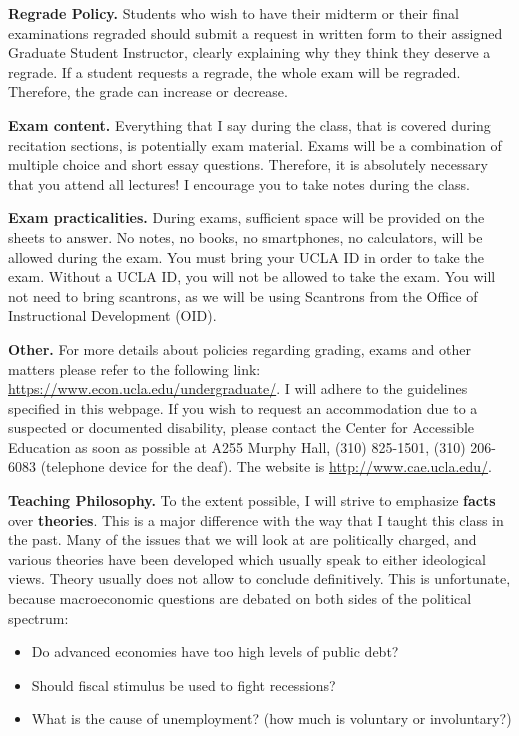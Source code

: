 \documentclass[]{book}
\providecommand{\tightlist}{%
  \setlength{\itemsep}{0pt}\setlength{\parskip}{0pt}}
\begin{document}
\textbf{Regrade Policy.} Students who wish to have their midterm or
their final examinations regraded should submit a request in written
form to their assigned Graduate Student Instructor, clearly explaining
why they think they deserve a regrade. If a student requests a regrade,
the whole exam will be regraded. Therefore, the grade can increase or
decrease.

\textbf{Exam content.} Everything that I say during the class, that is
covered during recitation sections, is potentially exam material. Exams
will be a combination of multiple choice and short essay questions.
Therefore, it is absolutely necessary that you attend all lectures! I
encourage you to take notes during the class.

\textbf{Exam practicalities.} During exams, sufficient space will be
provided on the sheets to answer. No notes, no books, no smartphones, no
calculators, will be allowed during the exam. You must bring your UCLA
ID in order to take the exam. Without a UCLA ID, you will not be allowed
to take the exam. You will not need to bring scantrons, as we will be
using Scantrons from the Office of Instructional Development (OID).

\textbf{Other.} For more details about policies regarding grading, exams
and other matters please refer to the following link:
\url{https://www.econ.ucla.edu/undergraduate/}. I will adhere to the
guidelines specified in this webpage. If you wish to request an
accommodation due to a suspected or documented disability, please
contact the Center for Accessible Education as soon as possible at A255
Murphy Hall, (310) 825-1501, (310) 206-6083 (telephone device for the
deaf). The website is \url{http://www.cae.ucla.edu/}.

\textbf{Teaching Philosophy.} To the extent possible, I will strive to
emphasize \textbf{facts} over \textbf{theories}. This is a major
difference with the way that I taught this class in the past. Many of
the issues that we will look at are politically charged, and various
theories have been developed which usually speak to either ideological
views. Theory usually does not allow to conclude definitively. This is
unfortunate, because macroeconomic questions are debated on both sides
of the political spectrum:

\begin{itemize}
\tightlist
\item
  Do advanced economies have too high levels of public debt?
\item
  Should fiscal stimulus be used to fight recessions?
\item
  What is the cause of unemployment? (how much is voluntary or
  involuntary?)
\end{itemize}
\end{document}
